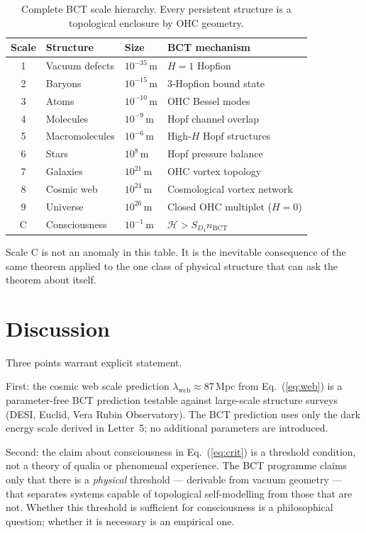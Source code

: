 \documentclass[aps,prl,twocolumn,superscriptaddress,floatfix]{revtex4-2}
\begin{document}
\begin{table}[h]
\centering
\caption{Complete BCT scale hierarchy. Every persistent structure
is a topological enclosure by OHC geometry.}
\begin{tabular}{clll}
\toprule
Scale & Structure & Size & BCT mechanism \\
\midrule
1 & Vacuum defects   & $10^{-35}$\,m & $H=1$ Hopfion \\
2 & Baryons          & $10^{-15}$\,m & 3-Hopfion bound state \\
3 & Atoms            & $10^{-10}$\,m & OHC Bessel modes \\
4 & Molecules        & $10^{-9}$\,m  & Hopf channel overlap \\
5 & Macromolecules   & $10^{-6}$\,m  & High-$H$ Hopf structures \\
6 & Stars            & $10^{8}$\,m   & Hopf pressure balance \\
7 & Galaxies         & $10^{21}$\,m  & OHC vortex topology \\
8 & Cosmic web       & $10^{24}$\,m  & Cosmological vortex network \\
9 & Universe         & $10^{26}$\,m  & Closed OHC multiplet ($H=0$) \\
C & Consciousness    & $10^{-1}$\,m  & $\mathcal{H} > S_{D_4} n_\mathrm{BCT}$ \\
\bottomrule
\end{tabular}
\end{table}

Scale C is not an anomaly in this table. It is the
inevitable consequence of the same theorem applied to the
one class of physical structure that can ask the theorem about
itself.

\section{Discussion}

Three points warrant explicit statement.

First: the cosmic web scale prediction
$\lambda_\mathrm{web} \approx 87$\,Mpc
from Eq.~(\ref{eq:web}) is a parameter-free BCT prediction
testable against large-scale structure surveys (DESI, Euclid,
Vera Rubin Observatory). The BCT prediction uses only the dark
energy scale derived in Letter~5; no additional parameters are
introduced.

Second: the claim about consciousness in
Eq.~(\ref{eq:crit}) is a threshold condition, not a theory
of qualia or phenomenal experience. The BCT programme claims
only that there is a \textit{physical} threshold --- derivable
from vacuum geometry --- that separates systems capable of
topological self-modelling from those that are not.
Whether this threshold is sufficient for consciousness is a
philosophical question; whether it is necessary is an
empirical one.
\end{document}
